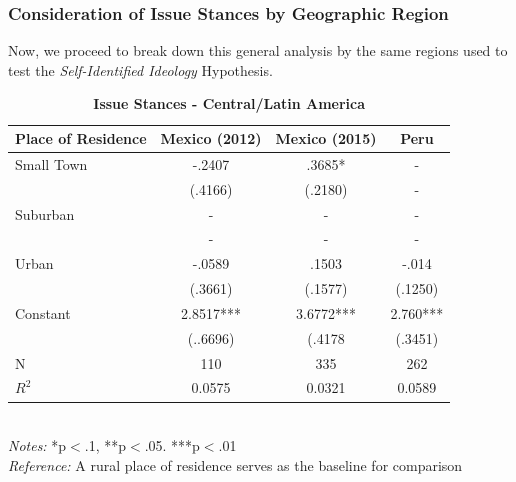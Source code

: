 \documentclass[12pt, titlepage]{article}
\newcommand\e{\emph}
\newcommand\tb{\textbf}
\begin{document}
\subsubsection{Consideration of Issue Stances by Geographic Region}

Now, we proceed to break down this general analysis by the same regions used to test the \e{Self-Identified Ideology} Hypothesis. 

\begin{singlespace}
	\begin{table}[H]
		\centering
		\caption{\tb{Issue Stances - Central/Latin America}}
		\begin{tabulary}{\linewidth}{l c c c}
			
			\hline
			\tb{Place of Residence}&\tb{Mexico (2012)}&\tb{Mexico (2015)} &\tb{Peru}\\
			\hline
			Small Town&-.2407 & .3685*& - \\
			&(.4166)  & (.2180)&-\\
			Suburban&- &- &-\\
			& -  & -&-\\
			Urban &-.0589 & .1503&-.014\\
			&(.3661) & (.1577)&(.1250)\\
			Constant& 2.8517*** &3.6772***&2.760*** \\
			& (..6696)  & (.4178&(.3451)\\
			N&110 & 335&262\\
			$R^2$&0.0575 & 0.0321&0.0589 \\
			\hline 
		\end{tabulary}
		\\
		\e{Notes:} *p$<$.1, **p$<$.05. ***p$<$.01 \\
		\e{Reference:} A rural place of residence serves as the baseline for comparison
		\label{CentAmerLib}
	\end{table}
\end{singlespace}
\end{document}
